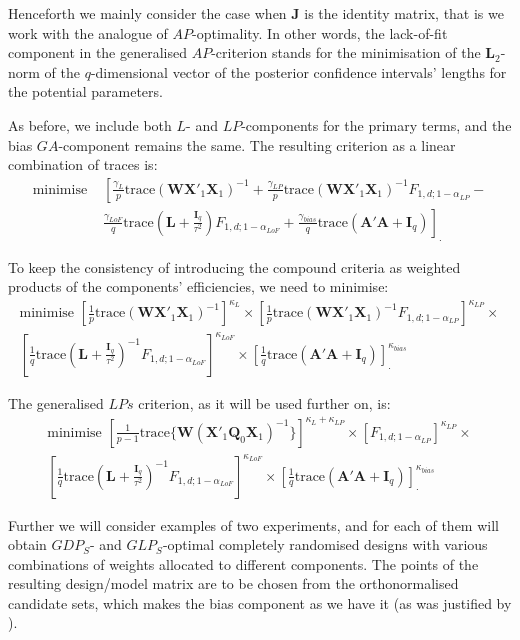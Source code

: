 Henceforth we mainly consider the case when $\bm{J}$ is the identity matrix, that is we work with the analogue of $AP$-optimality. In other words, the lack-of-fit component in the generalised $AP$-criterion  stands for the minimisation of the $\bm{L}_2$-norm of the $q$-dimensional vector of the posterior confidence intervals' lengths for the potential parameters. 

As before, we include both $L$- and $LP$-components for the primary terms, and the bias $GA$-component remains the same. The resulting criterion as a linear combination of traces is:
\begin{align*}
\mbox{minimise }&\left[ \frac{\gamma_{L}}{p}\mbox{trace}(\bm{WX}'_1\bm{X}_1)^{-1}+ \frac{\gamma_{LP}}{p}\mbox{trace}(\bm{WX}'_1\bm{X}_1)^{-1}F_{1,d;1-\alpha_{LP}}-\right. \\& \left.\frac{\gamma_{LoF}}{q}\mbox{trace}\left(\bm{L}+\frac{\bm{I}_{q}}{\tau^{2}}\right)F_{1,d;1-\alpha_{LoF}}+\frac{\gamma_{bias}}{q}\mbox{trace}(\bm{A}'\bm{A}+\bm{I}_{q})\right]_{.}
\end{align*} 

To keep the consistency of introducing the compound criteria as weighted products of the components' efficiencies, we need to minimise:
\begin{multline}
\label{eq::GLP_eff}
\mbox{minimise }\left[\frac{1}{p}\mbox{trace}(\bm{WX}'_1\bm{X}_1)^{-1}\right]^{\kappa_{L}}\times \left[\frac{1}{p}\mbox{trace}(\bm{WX}'_1\bm{X}_1)^{-1}F_{1,d;1-\alpha_{LP}}\right]^{\kappa_{LP}}\times \\ \left[\frac{1}{q}\mbox{trace}\left(\bm{L}+\frac{\bm{I}_{q}}{\tau^{2}}\right)^{-1}F_{1,d;1-\alpha_{LoF}}\right]^{\kappa_{LoF}}\times\left[\frac{1}{q}\mbox{trace}(\bm{A}'\bm{A}+\bm{I}_{q})\right]_{.}^{\kappa_{bias}}
\end{multline}

The generalised $LPs$ criterion, as it will be used further on, is:
\begin{multline}
\label{eq::GLPs_eff}
\mbox{minimise }\left[\frac{1}{p-1}\mbox{trace}\{\bm{W}(\bm{X}'_{1}\bm{Q}_{0}\bm{X}_{1})^{-1}\}\right]^{\kappa_{L}+\kappa_{LP}}\times \left[F_{1,d;1-\alpha_{LP}}\right]^{\kappa_{LP}}\times \\  \left[\frac{1}{q}\mbox{trace}\left(\bm{L}+\frac{\bm{I}_{q}}{\tau^{2}}\right)^{-1}F_{1,d;1-\alpha_{LoF}}\right]^{\kappa_{LoF}}\times\left[\frac{1}{q}\mbox{trace}(\bm{A'}\bm{A}+\bm{I}_{q})\right]_{.}^{\kappa_{bias}}
\end{multline}

Further we will consider examples of two experiments, and for each of them will obtain $GDP_S$- and $GLP_S$-optimal completely randomised designs with various combinations of weights allocated to different components. The points of the resulting design/model matrix are to be chosen from the orthonormalised candidate sets, which makes the bias component as we have it (as was justified by \cite{Goos2005model}). 

